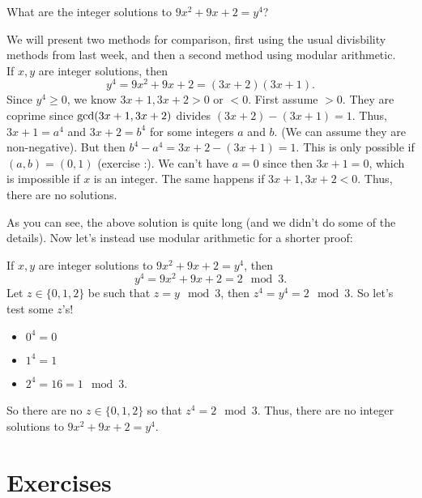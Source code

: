 \documentclass[11pt,dvipsnames]{book}
\def\gcd{{\rm gcd}}
\numberwithin{equation}{section} %
\numberwithin{figure}{section} %
\numberwithin{table}{section} %
\begin{document}
\begin{example}
What are the integer solutions to $9x^{2}+9x+2=y^{4}$?

 
 We will present two methods for comparison, first using the usual divisbility methods from last week, and then a second method using modular arithmetic.\\

  If $x,y$ are integer solutions, then
\[
y^{4}=9x^{2}+9x+2 =(3x+2)(3x+1).
\] 
 Since $y^{4}\geq 0$, we know $3x+1,3x+2> 0$ or $<0$.  First assume $>0$.   They are coprime since $\gcd(3x+1,3x+2)$ divides $ (3x+2)-(3x+1)=1$.   Thus, $3x+1=a^{4}$ and $3x+2=b^{4}$ for some integers $a$ and $b$.   (We can assume they are non-negative). But then $b^{4}-a^{4} =3x+2-(3x+1) =1$.   This is only possible if $(a,b)=(0,1)$  (exercise :). We can't have $a=0$ since then $3x+1=0$,  which is impossible if $x$ is an integer. The same happens if $3x+1,3x+2<0$.  Thus, there are no solutions.




\vspace{10pt}

As you can see, the above solution is quite long (and we didn't do some of the details). Now let's instead use modular arithmetic for a shorter proof:



 \vspace{10pt}

 If $x,y$ are integer solutions to $9x^{2}+9x+2=y^{4}$, then 
\[
y^{4}=9x^{2}+9x+2  
 = 2\mod 3.
\] 
Let $z\in \{0,1,2\}$ be such that $z = y\mod 3$, then   $z^{4} = y^{4} = 2\mod 3$.  
 So let's test some $z$'s! 
\begin{itemize}
\item $0^{4}=0$ 
\item $1^{4}=1$ 
\item $2^{4}=16 = 1 \mod 3$.  
\end{itemize}
So there are no $z\in \{0,1,2\}$ so that $z^{4} = 2 \mod 3$.  Thus, there are no integer solutions to $9x^{2}+9x+2=y^{4}$.




\end{example}


 

\section{Exercises}
\end{document}

